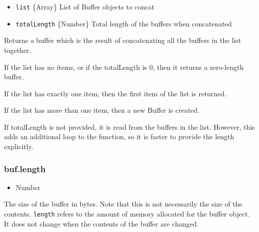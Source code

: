 \begin{itemize}
\item
  \texttt{list} \{Array\} List of Buffer objects to concat
\item
  \texttt{totalLength} \{Number\} Total length of the buffers when
  concatenated
\end{itemize}

Returns a buffer which is the result of concatenating all the buffers in
the list together.

If the list has no items, or if the totalLength is 0, then it returns a
zero-length buffer.

If the list has exactly one item, then the first item of the list is
returned.

If the list has more than one item, then a new Buffer is created.

If totalLength is not provided, it is read from the buffers in the list.
However, this adds an additional loop to the function, so it is faster
to provide the length explicitly.

\subsubsection{buf.length}

\begin{itemize}
\item
  Number
\end{itemize}

The size of the buffer in bytes. Note that this is not necessarily the
size of the contents. \texttt{length} refers to the amount of memory
allocated for the buffer object. It does not change when the contents of
the buffer are changed.

\begin{Shaded}
\begin{Highlighting}[]
 \NormalTok{);}

\NormalTok{(}\NormalTok{);}
\NormalTok{(}\NormalTok{, }\NormalTok{, }\NormalTok{);}
\NormalTok{(}\NormalTok{);}

\end{Highlighting}
\end{Shaded}

